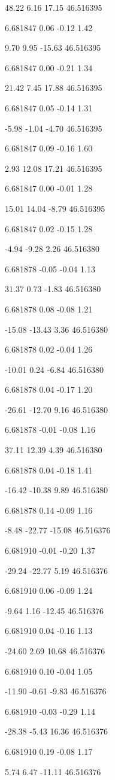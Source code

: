 48.22
6.16
17.15
46.516395

6.681847
0.06
-0.12
1.42

9.70
9.95
-15.63
46.516395

6.681847
0.00
-0.21
1.34

21.42
7.45
17.88
46.516395

6.681847
0.05
-0.14
1.31

-5.98
-1.04
-4.70
46.516395

6.681847
0.09
-0.16
1.60

2.93
12.08
17.21
46.516395

6.681847
0.00
-0.01
1.28

15.01
14.04
-8.79
46.516395

6.681847
0.02
-0.15
1.28

-4.94
-9.28
2.26
46.516380

6.681878
-0.05
-0.04
1.13

31.37
0.73
-1.83
46.516380

6.681878
0.08
-0.08
1.21

-15.08
-13.43
3.36
46.516380

6.681878
0.02
-0.04
1.26

-10.01
0.24
-6.84
46.516380

6.681878
0.04
-0.17
1.20

-26.61
-12.70
9.16
46.516380

6.681878
-0.01
-0.08
1.16

37.11
12.39
4.39
46.516380

6.681878
0.04
-0.18
1.41

-16.42
-10.38
9.89
46.516380

6.681878
0.14
-0.09
1.16

-8.48
-22.77
-15.08
46.516376

6.681910
-0.01
-0.20
1.37

-29.24
-22.77
5.19
46.516376

6.681910
0.06
-0.09
1.24

-9.64
1.16
-12.45
46.516376

6.681910
0.04
-0.16
1.13

-24.60
2.69
10.68
46.516376

6.681910
0.10
-0.04
1.05

-11.90
-0.61
-9.83
46.516376

6.681910
-0.03
-0.29
1.14

-28.38
-5.43
16.36
46.516376

6.681910
0.19
-0.08
1.17

5.74
6.47
-11.11
46.516376

